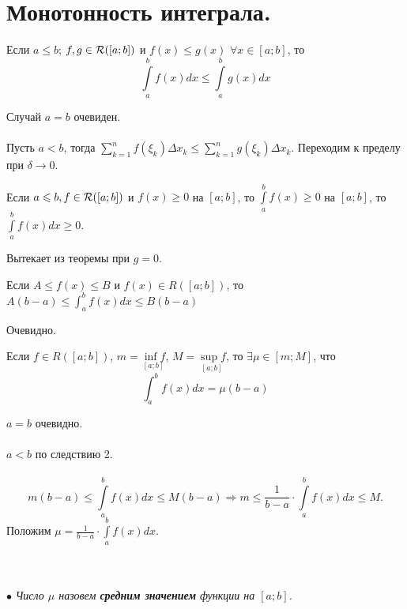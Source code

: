 \section{Монотонность интеграла.}
\begin{theorem}
	Если $a \leq b$; $f, g \in\mathcal{R}([a; b])$ и $f(x) \leq g(x)$ $\forall x \in [a;b]$, то $$\int\limits_a^bf(x)dx \leq \int\limits_a^b g(x)dx$$
\end{theorem}
\begin{Proof}
	Случай $a=b$ очевиден.\\\\
	Пусть $a<b$, тогда $\sum\limits_{k=1}^n f(\xi_k)\Delta x_k \leq \sum\limits_{k=1}^n g(\xi_k)\Delta x_k$. Переходим к пределу при $\delta \rightarrow 0$.
\end{Proof}
\begin{corollary}
Если $a \leqslant b, f \in\mathcal{R}([a; b])$ и $f(x) \geq 0$ на $[a;b]$, то $\int\limits_a^b f(x) \geq 0$ на $[a;b]$, то $\int\limits_a^b f(x)dx \geq 0$.
\end{corollary}
\begin{Proof}
	Вытекает из теоремы при $g=0$.
\end{Proof}
\begin{corollary}
Если $A \leq f(x) \leq B$ и $f(x) \in R([a;b])$, то $A(b-a) \leq \int_a^b f(x)dx \leq B(b-a)$
\end{corollary}
\begin{Proof}
	Очевидно.
\end{Proof}
\begin{corollary}
Если $f \in R([a;b])$, $m = \underset{[a;b]}{\inf f}$, $M = \underset{[a;b]}{\sup f}$, то $\exists \mu \in [m;M]$, что $$\int_a^bf(x)dx = \mu(b-a)$$
\end{corollary}
\begin{Proof}
	$a=b$ очевидно.\\\\
	$a < b$ по следствию 2.\\\\
	$$m(b-a) \leq \int\limits_a^bf(x)dx \leq M(b-a) \Rightarrow m \leq \frac{1}{b-a}\cdot \int\limits_a^bf(x)dx \leq M.$$
	Положим $\mu = \frac{1}{b-a}\cdot \int\limits_a^bf(x)dx$.
\end{Proof}\\\\
$\bullet$\textit{ Число $\mu$ назовем \textbf{средним значением} функции на $[a;b]$.}
